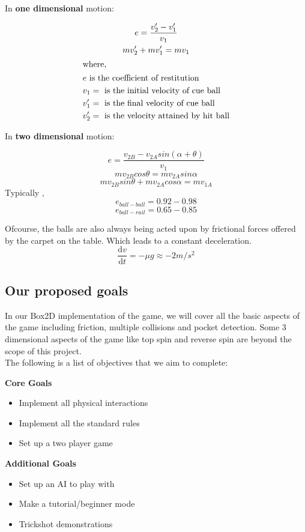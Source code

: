 \documentclass[a4paper,12pt]{article}
\begin{document}
In \textbf{one dimensional} motion:

\begin{gather}
e = \frac{v_2' - v_1'}{v_1}\\
mv_2' + mv_1' = mv_1\\
\intertext{where,}
\begin{aligned}
 &e \text{ is the coefficient of restitution}\\
 &v_1 =\text{ is the initial velocity of cue ball}\\
 &v_1' =\text{ is the final velocity of cue ball}\\
 &v_2' =\text{ is the velocity attained by hit ball}
\end{aligned}\notag
\end{gather}
\vspace{0.2cm}

In \textbf{two dimensional} motion:

$$ e = \frac{v_{2B} - v_{2A}sin(\alpha+\theta)}{v_1}$$
$$ mv_{2B}cos\theta = mv_{2A}sin\alpha$$
$$ mv_{2B}sin\theta + mv_{2A}cos\alpha = mv_{1A}$$
\hspace{0.6cm}Typically \cite{data},
$$e_{ball-ball} = 0.92-0.98$$
$$e_{ball-rail} = 0.65-0.85$$

Ofcourse, the balls are also always being acted upon by frictional forces offered by the carpet on the table. Which leads to a constant deceleration.
$$\frac{\mathrm{d} v}{\mathrm{d} t} = - \mu g \approx  -2 m/s^2$$

\subsection{Our proposed goals}
In our Box2D implementation of the game, we will cover all the basic aspects of the game including friction, multiple collisions and pocket detection. Some 3 dimensional aspects of the game like top spin and reverse spin are beyond the scope of this project.\\
The following is a list of objectives that we aim to complete:
\begin{multicols}{2}
\textbf{Core Goals}

\begin{itemize}
  \item Implement all physical interactions
  \item Implement all the standard rules
  \item Set up a two player game
\end{itemize}\columnbreak
\hspace{0.5cm}\textbf{Additional Goals}
\begin{itemize}
  \item Set up an AI to play with
  \item Make a tutorial/beginner mode
  \item Trickshot demonstrations
\end{itemize}
\end{multicols}
\end{document}
